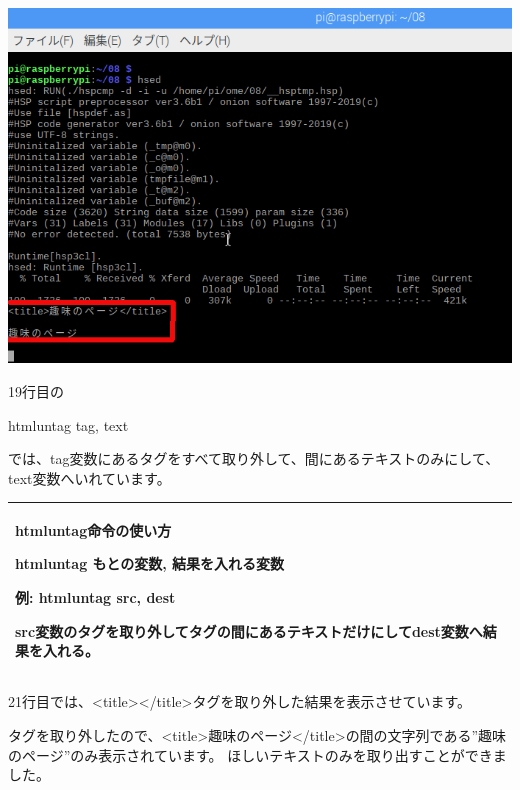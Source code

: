 \documentclass[a4paper,12pt,dvipdfmx]{jarticle}
\begin{document}
\begin{center}
\includegraphics[width=15.411cm]{textbook-img015.png}

\end{center}


\bigskip


\bigskip

\clearpage
19行目の

htmluntag tag, text

では、tag変数にあるタグをすべて取り外して、間にあるテキストのみにして、text変数へいれています。


\bigskip

\begin{center}
\tablefirsthead{}
\tablehead{}
\tabletail{}
\tablelasttail{}
\begin{supertabular}{|m{16.806cm}|}
\hline
htmluntag命令の使い方

{\bfseries htmluntag もとの変数, 結果を入れる変数}

例: htmluntag src, dest

src変数のタグを取り外してタグの間にあるテキストだけにしてdest変数へ結果を入れる。\\\hline
\end{supertabular}
\end{center}

\bigskip

21行目では、{\textless}title{\textgreater}{\textless}/title{\textgreater}タグを取り外した結果を表示させています。

タグを取り外したので、{\textless}title{\textgreater}趣味のページ{\textless}/title{\textgreater}の間の文字列である”趣味のページ”のみ表示されています。
ほしいテキストのみを取り出すことができました。
\end{document}
